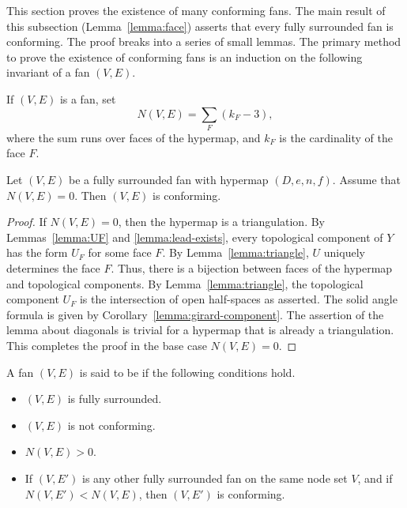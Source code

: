This section proves the existence of many conforming fans.  The main result
of this subsection
(Lemma~\ref{lemma:face}) asserts that every fully surrounded fan is conforming.  The
proof breaks into a series of small lemmas.  The primary
method to prove the existence of conforming fans is an induction on
the following invariant of a fan $(V,E)$.

\begin{definition}[$N(V,E)$]
If $(V,E)$ is a fan,  set
\begin{displaymath}
N(V,E) = \sum_F (k_F - 3),
\end{displaymath}
where the sum runs over faces of the hypermap, and $k_F$ is the
cardinality of the face $F$.
\end{definition}

\begin{lemma}[]\label{lemma:N=0}
Let $(V,E)$ be a fully surrounded fan with hypermap $(D,e,n,f)$. 
Assume that $N(V,E)=0$.
Then $(V,E)$ is conforming.
\end{lemma}
%
%
%

\begin{proof}
If $N(V,E)=0$, then the hypermap is a triangulation.  By
Lemmas~\ref{lemma:UF} and \ref{lemma:lead-exists}, every topological
component of $Y$ has the form $U_F$ for some face $F$.  By
Lemma~\ref{lemma:triangle}, $U$ uniquely determines the face $F$.
Thus, there is a bijection between faces of the hypermap and
topological components.  By Lemma~\ref{lemma:triangle}, the
topological component $U_F$ is the intersection of open half-spaces
as asserted.  The solid angle formula is given by
Corollary~\ref{lemma:girard-component}.  The assertion of the lemma
about diagonals
is trivial for a hypermap that is already a triangulation. This
completes the proof in the base case $N(V,E)=0$.
\end{proof}

\begin{definition}
A fan $(V,E)$ is said to be  if
the following conditions hold.
\begin{itemize}
\item $(V,E)$ is fully surrounded.
\item $(V,E)$ is not conforming.
\item $N(V,E)>0$.
\item If $(V,E')$ is any other fully surrounded fan on the same node
set $V$, and if $N(V,E') < N(V,E)$, then $(V,E')$ is conforming.
\end{itemize}
\end{definition}
%


